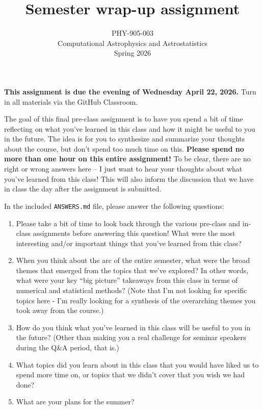 \documentclass[10pt]{article}
\title{Semester wrap-up assignment}
\author{PHY-905-003\\Computational Astrophysics and
  Astrostatistics\\Spring 2026}
\date{} %
\begin{document}
 
\maketitle

\vspace{-5mm}

\noindent
\textbf{This assignment is due the evening of Wednesday April 22, 2026.}
 Turn in all materials via the GitHub Classroom.

\vspace{5mm}


The goal of this final pre-class assignment is to have you spend a bit
of time reflecting on what you've learned in this class and how it
might be useful to you in the future.  The idea is for you to
synthesize and summarize your thoughts about the course, but don't
spend too much time on this.  \textbf{Please spend no more than one
hour on this entire assignment!}  To be clear, there are no right or
wrong answers here -- I just want to hear your thoughts about what
you've learned from this class!  This will also inform the discussion
that we have in class the day after the assignment is submitted.

\vspace{3mm}

\noindent
In the included \texttt{ANSWERS.md} file, please answer the following
questions:

\begin{enumerate}

\item Please take a bit of time to look back through the various 
pre-class and in-class assignments before answering this question!  What 
were the most interesting and/or important things that you've learned from 
this class?

\item When you think about the arc of the entire semester, what 
were the broad themes that emerged from the topics that we've explored?  
In other words, what were your key ``big picture'' takeaways from this class 
in terms of numerical and statistical methods?  (Note that I'm not looking
for specific topics here - I'm really looking for a synthesis of the 
overarching themes you took away from the course.)

\item How do you think what you've learned in this class will be 
useful to you in the future?  (Other than making you a real challenge for 
seminar speakers during the Q\&A period, that is.)

\item What topics did you learn about in this class that you would 
have liked us to spend more time on, or topics that we didn't cover that you 
wish we had done?

\item What are your plans for the summer?

\end{enumerate}
\end{document}
